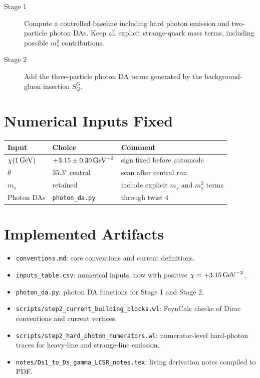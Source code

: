 \documentclass[11pt]{article}
\begin{document}
\begin{description}
  \item[Stage 1] Compute a controlled baseline including hard photon emission
  and two-particle photon DAs.  Keep all explicit strange-quark mass terms,
  including possible $m_s^2$ contributions.

  \item[Stage 2] Add the three-particle photon DA terms generated by the
  background-gluon insertion $S_Q^G$.
\end{description}

\section{Numerical Inputs Fixed}

\begin{center}
\begin{tabular}{lll}
\toprule
Input & Choice & Comment\\
\midrule
$\chi(1\,{\rm GeV})$ & $+3.15\pm0.30\,{\rm GeV}^{-2}$ & sign fixed before automode\\
$\theta$ & $35.3^\circ$ central & scan after central run\\
$m_s$ & retained & include explicit $m_s$ and $m_s^2$ terms\\
Photon DAs & \texttt{photon\_da.py} & through twist 4\\
\bottomrule
\end{tabular}
\end{center}

\section{Implemented Artifacts}

\begin{itemize}
  \item \texttt{conventions.md}: core conventions and current definitions.
  \item \texttt{inputs\_table.csv}: numerical inputs, now with positive
  $\chi=+3.15\,{\rm GeV}^{-2}$.
  \item \texttt{photon\_da.py}: photon DA functions for Stage 1 and Stage 2.
  \item \texttt{scripts/step2\_current\_building\_blocks.wl}: FeynCalc checks
  of Dirac conventions and current vertices.
  \item \texttt{scripts/step2\_hard\_photon\_numerators.wl}: numerator-level
  hard-photon traces for heavy-line and strange-line emission.
  \item \texttt{notes/Ds1\_to\_Ds\_gamma\_LCSR\_notes.tex}: living derivation
  notes compiled to PDF.
\end{itemize}
\end{document}
